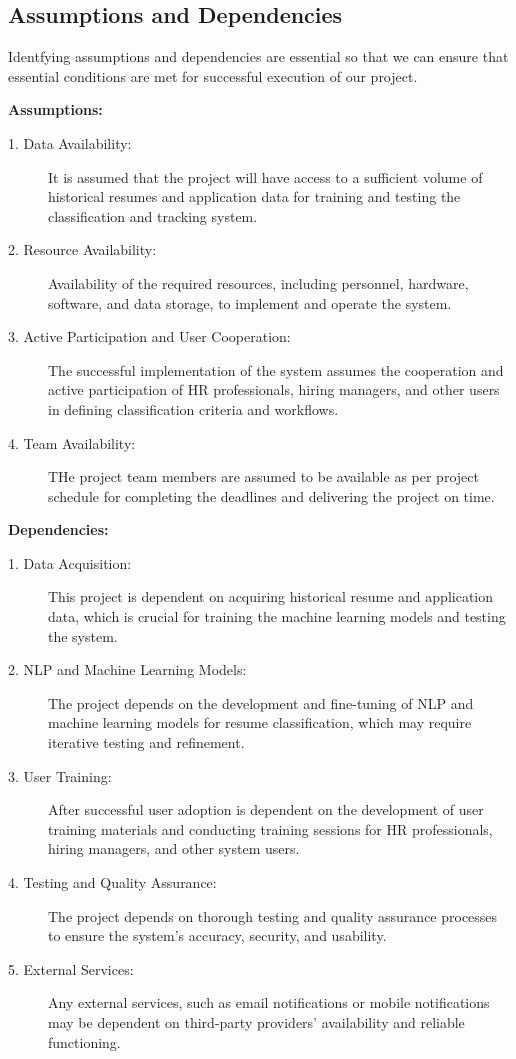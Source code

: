 \subsection{Assumptions and Dependencies}
Identfying assumptions and dependencies are essential so that we can ensure that essential conditions are met for successful execution of our project.

\textbf{Assumptions:}
\begin{description}
    \item [1. Data Availability:] It is assumed that the project will have access to a sufficient volume of historical resumes and application data for training and testing the classification and tracking system.
    \item [2. Resource Availability:] Availability of the required resources, including personnel, hardware, software, and data storage, to implement and operate the system.
    \item [3. Active Participation and User Cooperation:] The successful implementation of the system assumes the cooperation and active participation of HR professionals, hiring managers, and other users in defining classification criteria and workflows. 
    \item [4. Team Availability:] THe project team members are assumed to be available as per project schedule for completing the deadlines and delivering the project on time.
\end{description}

\textbf{Dependencies:}
\begin{description}
    \item [1. Data Acquisition:] This project is dependent on acquiring historical resume and application data, which is crucial for training the machine learning models and testing the system.
    \item [2. NLP and Machine Learning Models:] The project depends on the development and fine-tuning of NLP and machine learning models for resume classification, which may require iterative testing and refinement.
    \item [3. User Training:] After successful user adoption is dependent on the development of user training materials and conducting training sessions for HR professionals, hiring managers, and other system users.
    \item [4. Testing and Quality Assurance:] The project depends on thorough testing and quality assurance processes to ensure the system's accuracy, security, and usability.
    \item [5. External Services:] Any external services, such as email notifications or mobile notifications may be dependent on third-party providers' availability and reliable functioning.
\end{description}


